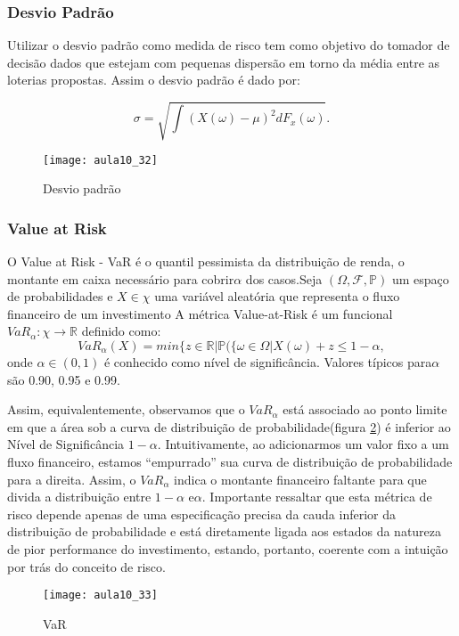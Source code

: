 \subsubsection{Desvio Padrão}
 Utilizar o desvio padrão como medida de risco tem como objetivo do tomador de decisão dados que estejam com pequenas dispersão em torno da média entre as loterias propostas. Assim o desvio padrão é dado por:

\[
\sigma=\sqrt{\int(X(\omega)-\mu)^{2}dF_{x}(\omega)}.
\]
\begin{figure}[H]
\begin{centering}
\texttt{[image: aula10\_32]}\protect\caption{\label{fig:aula10_32} Desvio padrão}
\end{centering}
\end{figure}

\subsubsection{Value at Risk} 
 O Value at Risk - VaR é o quantil pessimista da distribuição de renda, o montante em caixa necessário para cobrir$\alpha$ dos casos.Seja $(\varOmega,\mathcal{F},\mathbb{P})$ um espaço de probabilidades
e $X\in\chi$ uma variável aleatória que representa o fluxo financeiro
de um investimento A métrica Value-at-Risk é um funcional $VaR_{\alpha}:\chi\rightarrow\mathbb{R}$
definido como: 
\[
VaR_{\alpha}(X)=min\{z\in\mathbb{R}|\mathbb{P}(\{\omega\in\varOmega|X(\omega)+z\leq1-\alpha,
\]
onde $\alpha\in(0,1)$ é conhecido como nível de significância. Valores
típicos para$\alpha$são 0.90, 0.95 e 0.99.

Assim, equivalentemente, observamos que o $VaR_{\alpha}$ está associado
ao ponto limite em que a área sob a curva de distribuição de probabilidade(figura \ref{fig:aula10_32})
é inferior ao Nível de Significância $1-\alpha.$ Intuitivamente,
ao adicionarmos um valor fixo a um fluxo financeiro, estamos \textquotedblleft empurrado\textquotedblright{}
sua curva de distribuição de probabilidade para a direita. Assim,
o $VaR_{\alpha}$ indica o montante financeiro faltante para que divida
a distribuição entre $1-\alpha$ e$\alpha$. Importante ressaltar
que esta métrica de risco depende apenas de uma especificação precisa
da cauda inferior da distribuição de probabilidade e está diretamente
ligada aos estados da natureza de pior performance do investimento,
estando, portanto, coerente com a intuição por trás do conceito de
risco.
\begin{figure}[H]
\begin{centering}
\texttt{[image: aula10\_33]}\protect\caption{\label{fig:aula10_32} VaR}
\end{centering}
\end{figure}

